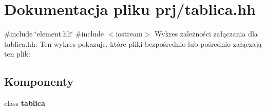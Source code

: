 \section{\-Dokumentacja pliku prj/tablica.hh}
\label{tablica_8hh}
{\ttfamily \#include \char`\"{}element.\-hh\char`\"{}}\*
{\ttfamily \#include $<$iostream$>$}\*
\-Wykres zależności załączania dla tablica.\-hh\-:
\-Ten wykres pokazuje, które pliki bezpośrednio lub pośrednio załączają ten plik\-:
\subsection*{\-Komponenty}
\begin{DoxyCompactItemize}
\item 
class {\bf tablica}
\end{DoxyCompactItemize}
